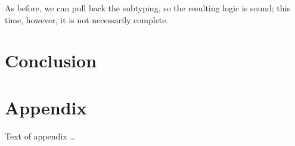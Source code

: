 \documentclass[sigplan,9pt,review,anonymous]{acmart}\settopmatter{printfolios=true,printccs=false,printacmref=false}
\begin{document}
As before, we can pull back the subtyping, so the resulting logic is sound; this time, however, it is not necessarily complete.

\section{Conclusion}










\begin{acks}                            %
\end{acks}


%


\appendix
\section{Appendix}

Text of appendix \ldots
\end{document}
